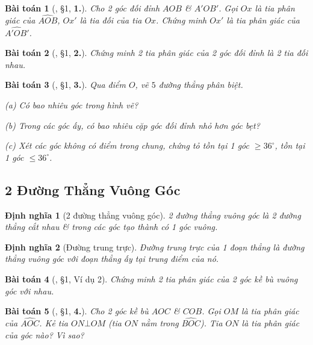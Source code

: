 \documentclass{article}
\numberwithin{equation}{section}
\newtheorem{dinhnghia}{Định nghĩa}[section]
\newtheorem{baitoan}{Bài toán}[section]
\begin{document}
\begin{baitoan}[\cite{Binh_Toan_7_tap_1}, \S1, \textbf{1.}]
	Cho 2 góc đối đỉnh $AOB$ \& $A'OB'$. Gọi $Ox$ là tia phân giác của $\widehat{AOB}$, $Ox'$ là tia đối của tia $Ox$. Chứng minh $Ox'$ là tia phân giác của $\widehat{A'OB'}$.
\end{baitoan}

\begin{baitoan}[\cite{Binh_Toan_7_tap_1}, \S1, \textbf{2.}]
	Chứng minh 2 tia phân giác của 2 góc đối đỉnh là 2 tia đối nhau.
\end{baitoan}

\begin{baitoan}[\cite{Binh_Toan_7_tap_1}, \S1, \textbf{3.}]
	Qua điểm $O$, vẽ $5$ đường thẳng phân biệt.
	\begin{enumerate*}
		\item[(a)] Có bao nhiêu góc trong hình vẽ?
		\item[(b)] Trong các góc ấy, có bao nhiêu cặp góc đối đỉnh nhỏ hơn góc bẹt?
		\item[(c)] Xét các góc không có điểm trong chung, chứng tỏ tồn tại 1 góc $\ge36^\circ$, tồn tại 1 góc $\le36^\circ$.
	\end{enumerate*}
\end{baitoan}


\subsection{2 Đường Thẳng Vuông Góc}

\begin{dinhnghia}[2 đường thẳng vuông góc]
	\emph{2 đường thẳng vuông góc} là 2 đường thẳng cắt nhau \& trong các góc tạo thành có 1 góc vuông.
\end{dinhnghia}

\begin{dinhnghia}[Đường trung trực]
	\emph{Đường trung trực} của 1 đoạn thẳng là đường thẳng vuông góc với đoạn thẳng ấy tại trung điểm của nó.
\end{dinhnghia}

\begin{baitoan}[\cite{Binh_Toan_7_tap_1}, \S1, Ví dụ 2]
	Chứng minh 2 tia phân giác của 2 góc kề bù vuông góc với nhau.
\end{baitoan}

\begin{baitoan}[\cite{Binh_Toan_7_tap_1}, \S1, \textbf{4.}]
	Cho 2 góc kề bù $AOC$ \& $COB$. Gọi $OM$ là tia phân giác của $\widehat{AOC}$. Kẻ tia $ON\bot OM$ (tia $ON$ nằm trong $\widehat{BOC}$). Tia $ON$ là tia phân giác của góc nào? Vì sao?
\end{baitoan}
\end{document}
